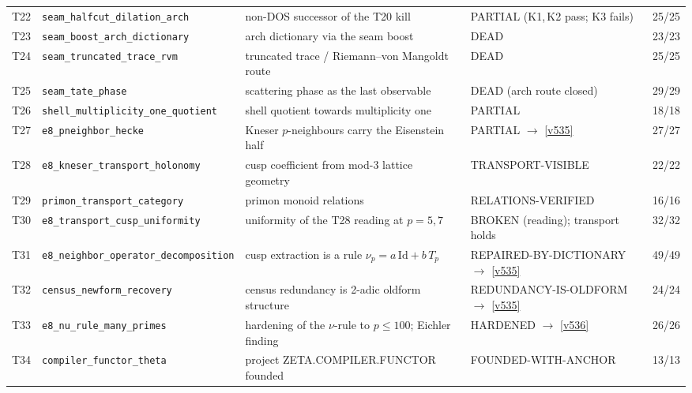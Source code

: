 \documentclass[11pt,a4paper]{article}
\begin{document}
{\begin{xltabular}{\linewidth}{@{}p{0.95cm} >{\raggedright\arraybackslash}p{3.1cm} Y >{\raggedright\scriptsize\arraybackslash}p{3.35cm} p{1.15cm}@{}}
T22 & \texttt{\scriptsize seam\_\allowbreak halfcut\_\allowbreak dilation\_\allowbreak arch} & non-DOS successor of the T20 kill & PARTIAL (K1,\,K2 pass; K3 fails) & 25/25\\
T23 & \texttt{\scriptsize seam\_\allowbreak boost\_\allowbreak arch\_\allowbreak dictionary} & arch dictionary via the seam boost & DEAD & 23/23\\
T24 & \texttt{\scriptsize seam\_\allowbreak truncated\_\allowbreak trace\_\allowbreak rvm} & truncated trace / Riemann--von Mangoldt route & DEAD & 25/25\\
T25 & \texttt{\scriptsize seam\_\allowbreak tate\_\allowbreak phase} & scattering phase as the last observable & DEAD (arch route closed) & 29/29\\
T26 & \texttt{\scriptsize shell\_\allowbreak multiplicity\_\allowbreak one\_\allowbreak quotient} & shell quotient towards multiplicity one & PARTIAL & 18/18\\
T27 & \texttt{\scriptsize e8\_\allowbreak pneighbor\_\allowbreak hecke} & Kneser $p$-neighbours carry the Eisenstein half & PARTIAL $\to$ \vref{v535} & 27/27\\
T28 & \texttt{\scriptsize e8\_\allowbreak kneser\_\allowbreak transport\_\allowbreak holonomy} & cusp coefficient from mod-3 lattice geometry & TRANSPORT-VISIBLE & 22/22\\
T29 & \texttt{\scriptsize primon\_\allowbreak transport\_\allowbreak category} & primon monoid relations & RELATIONS-VERIFIED & 16/16\\
T30 & \texttt{\scriptsize e8\_\allowbreak transport\_\allowbreak cusp\_\allowbreak uniformity} & uniformity of the T28 reading at $p=5,7$ & BROKEN (reading); transport holds & 32/32\\
T31 & \texttt{\scriptsize e8\_\allowbreak neighbor\_\allowbreak operator\_\allowbreak decomposition} & cusp extraction is a rule $\nu_p=a\,\mathrm{Id}+b\,T_p$ & REPAIRED-BY-DICTIONARY $\to$ \vref{v535} & 49/49\\
T32 & \texttt{\scriptsize census\_\allowbreak newform\_\allowbreak recovery} & census redundancy is 2-adic oldform structure & REDUNDANCY-IS-OLDFORM $\to$ \vref{v535} & 24/24\\
T33 & \texttt{\scriptsize e8\_\allowbreak nu\_\allowbreak rule\_\allowbreak many\_\allowbreak primes} & hardening of the $\nu$-rule to $p\le100$; Eichler finding & HARDENED $\to$ \vref{v536} & 26/26\\
T34 & \texttt{\scriptsize compiler\_\allowbreak functor\_\allowbreak theta} & project ZETA.COMPILER.FUNCTOR founded & FOUNDED-WITH-ANCHOR & 13/13\\

\end{xltabular}}
\end{document}
